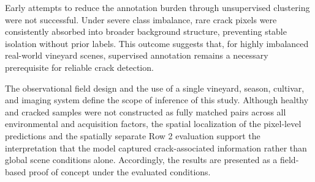 \medskip\noindent
Early attempts to reduce the annotation burden through unsupervised clustering were not successful. Under severe class imbalance, rare crack pixels were consistently absorbed into broader background structure, preventing stable isolation without prior labels. This outcome suggests that, for highly imbalanced real-world vineyard scenes, supervised annotation remains a necessary prerequisite for reliable crack detection.

\medskip\noindent
The observational field design and the use of a single vineyard, season, cultivar, and imaging system define the scope of inference of this study. Although healthy and cracked samples were not constructed as fully matched pairs across all environmental and acquisition factors, the spatial localization of the pixel-level predictions and the spatially separate Row 2 evaluation support the interpretation that the model captured crack-associated information rather than global scene conditions alone. Accordingly, the results are presented as a field-based proof of concept under the evaluated conditions.
